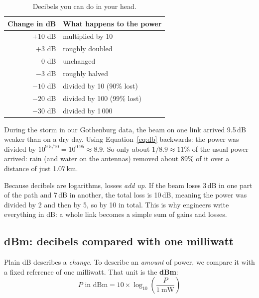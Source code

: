 \documentclass[11pt,a4paper]{article}
\begin{document}
\begin{table}[h]
\centering\small
\begin{tabular}{rl}
\toprule
Change in dB & What happens to the power \\
\midrule
$+10$ dB & multiplied by 10 \\
$+3$ dB & roughly doubled \\
$0$ dB & unchanged \\
$-3$ dB & roughly halved \\
$-10$ dB & divided by 10 (90\% lost) \\
$-20$ dB & divided by 100 (99\% lost) \\
$-30$ dB & divided by 1\,000 \\
\bottomrule
\end{tabular}
\caption{Decibels you can do in your head.}
\label{tab:db}
\end{table}

\begin{example}
During the storm in our Gothenburg data, the beam on one link arrived 9.5\,dB weaker than on a dry
day. Using Equation~\ref{eq:db} backwards: the power was divided by
$10^{9.5/10} = 10^{0.95} \approx 8.9$. So only about $1/8.9 \approx 11\%$ of the usual power arrived:
rain (and water on the antennas) removed about 89\% of it over a distance of just 1.07\,km.
\end{example}

Because decibels are logarithms, losses \emph{add up}. If the beam loses 3\,dB in one part of the path
and 7\,dB in another, the total loss is 10\,dB, meaning the power was divided by 2 and then by 5,
so by 10 in total. This is why engineers write everything in dB: a whole link becomes a simple
sum of gains and losses.

\subsection{dBm: decibels compared with one milliwatt}

Plain dB describes a \emph{change}. To describe an \emph{amount} of power, we compare it with a fixed
reference of one milliwatt. That unit is the \textbf{dBm}:
\begin{equation}
P \text{ in dBm} = 10 \times \log_{10}\!\left(\frac{P}{1\ \text{mW}}\right)
\end{equation}
\end{document}
